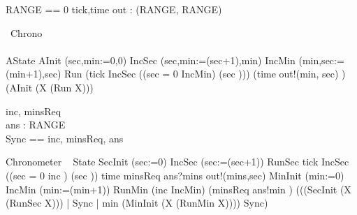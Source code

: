 \begin{circus}
RANGE == 0 
\also \circchannel tick,time
\also \circchannel out : (RANGE, RANGE)
\end{circus}
\begin{circus}
\circprocess\ Chrono \circdef\\
\circbegin\\ 
\circstate AState 
AInit \circdef (sec,min:=0,0)
IncSec \circdef (sec,min:=(sec+1),min)
IncMin  \circdef (min,sec:=(min+1),sec)
Run \circdef 
  (tick \then IncSec \circseq 
    ((\lcircguard sec = 0 \rcircguard \circguard IncMin) 
    \extchoice (\lcircguard sec  \rcircguard \circguard \Skip)))
    \extchoice (time \then out!(min, sec) \then \Skip) 
\circspot (AInit \circseq (\circmu X \circspot (Run \circseq X)))
\circend
\end{circus}
\begin{circus}
\circchannel inc, minsReq\\
\also \circchannel ans : RANGE\\
\also \circchannelset Sync == \lchanset inc, minsReq, ans \rchanset
\end{circus}
\begin{circus}
\circprocess Chronometer \circdef\ \circbegin
\circstate State 
SecInit \circdef (sec:=0)
IncSec \circdef (sec:=(sec+1))
RunSec  \circdef  
    tick \then IncSec \circseq
    ((\lcircguard sec = 0 \rcircguard \circguard inc \then \Skip) 
    \extchoice (\lcircguard sec  \rcircguard \circguard \Skip))
    \extchoice time \then minsReq \then ans?mins \then out!(mins,sec) 
      \then \Skip 
MinInit \circdef (min:=0)
IncMin \circdef (min:=(min+1))
RunMin \circdef (inc \then IncMin) \extchoice (minsReq \then ans!min \then \Skip)
\circspot 
(((SecInit \circseq (\circmu X \circspot (RunSec \circseq X)))
 | Sync | {min} \rpar 
(MinInit \circseq (\circmu X \circspot (RunMin \circseq X)))) \circhide Sync)
\circend
\end{circus}